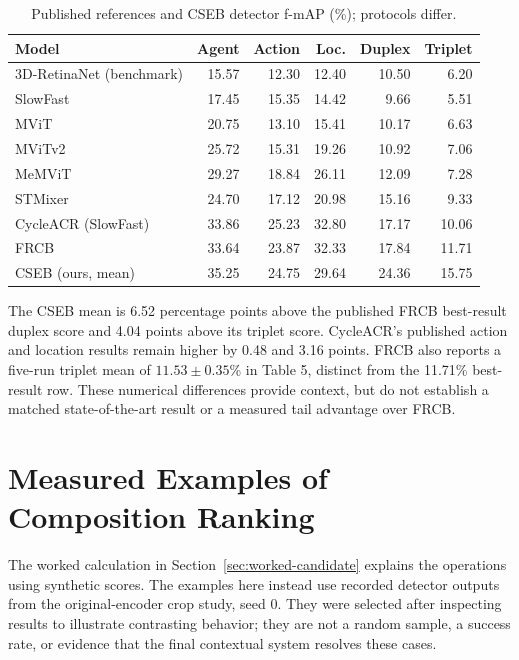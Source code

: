 \begin{table}[htbp]
\centering
\caption{Published references and CSEB detector f-mAP (\%); protocols differ.}
\label{tab:published}
\begin{singlespace}
\begin{tabularx}{\textwidth}{@{}Xrrrrr@{}}
\toprule
\textbf{Model} & \textbf{Agent} & \textbf{Action} & \textbf{Loc.} & \textbf{Duplex} & \textbf{Triplet} \\
\midrule
3D-RetinaNet (benchmark) & 15.57 & 12.30 & 12.40 & 10.50 & 6.20 \\
SlowFast & 17.45 & 15.35 & 14.42 & 9.66 & 5.51 \\
MViT & 20.75 & 13.10 & 15.41 & 10.17 & 6.63 \\
MViTv2 & 25.72 & 15.31 & 19.26 & 10.92 & 7.06 \\
MeMViT & 29.27 & 18.84 & 26.11 & 12.09 & 7.28 \\
STMixer & 24.70 & 17.12 & 20.98 & 15.16 & 9.33 \\
CycleACR (SlowFast) & 33.86 & 25.23 & 32.80 & 17.17 & 10.06 \\
FRCB & 33.64 & 23.87 & 32.33 & 17.84 & 11.71 \\
CSEB (ours, mean) & 35.25 & 24.75 & 29.64 & 24.36 & 15.75 \\
\bottomrule
\end{tabularx}
\end{singlespace}
\end{table}

The CSEB mean is 6.52 percentage points above the published FRCB best-result duplex score and 4.04 points above its triplet score. CycleACR's published action and location results remain higher by 0.48 and 3.16 points. FRCB also reports a five-run triplet mean of \(11.53\pm0.35\)\% in Table 5, distinct from the 11.71\% best-result row. These numerical differences provide context, but do not establish a matched state-of-the-art result or a measured tail advantage over FRCB.

\section{Measured Examples of Composition Ranking}
\label{sec:measured-examples}

The worked calculation in Section~\ref{sec:worked-candidate} explains the operations using synthetic scores. The examples here instead use recorded detector outputs from the original-encoder crop study, seed 0. They were selected after inspecting results to illustrate contrasting behavior; they are not a random sample, a success rate, or evidence that the final contextual system resolves these cases.

